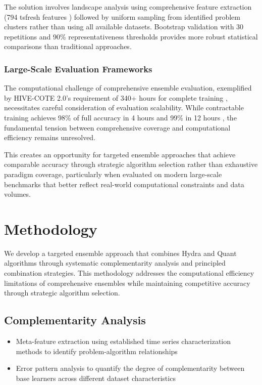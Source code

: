 \documentclass[pdflatex,sn-basic]{sn-jnl}           %
\theoremstyle{thmstyleone}%
\theoremstyle{thmstyletwo}%
\theoremstyle{thmstylethree}%
\begin{document}
The solution involves landscape analysis using comprehensive feature extraction (794 tsfresh features \citep[p.~3]{less-is-more}) followed by uniform sampling from identified problem clusters rather than using all available datasets. Bootstrap validation with 30 repetitions and 90\% representativeness thresholds \citep[p.~5-6]{less-is-more} provides more robust statistical comparisons than traditional approaches.

\subsubsection{Large-Scale Evaluation Frameworks}

The computational challenge of comprehensive ensemble evaluation, exemplified by HIVE-COTE 2.0's requirement of 340+ hours for complete training \citep[Table~4, p.~17]{hive-cote-2}, necessitates careful consideration of evaluation scalability. While contractable training achieves 98\% of full accuracy in 4 hours and 99\% in 12 hours \citep[p.~27]{hive-cote-2}, the fundamental tension between comprehensive coverage and computational efficiency remains unresolved.

This creates an opportunity for targeted ensemble approaches that achieve comparable accuracy through strategic algorithm selection rather than exhaustive paradigm coverage, particularly when evaluated on modern large-scale benchmarks that better reflect real-world computational constraints and data volumes.

\section{Methodology}\label{sec3}

We develop a targeted ensemble approach that combines Hydra and Quant algorithms through systematic complementarity analysis and principled combination strategies. This methodology addresses the computational efficiency limitations of comprehensive ensembles while maintaining competitive accuracy through strategic algorithm selection.

\subsection{Complementarity Analysis}
\begin{itemize}
\item Meta-feature extraction using established time series characterization methods to identify problem-algorithm relationships
\item Error pattern analysis to quantify the degree of complementarity between base learners across different dataset characteristics
\end{itemize}
\end{document}
